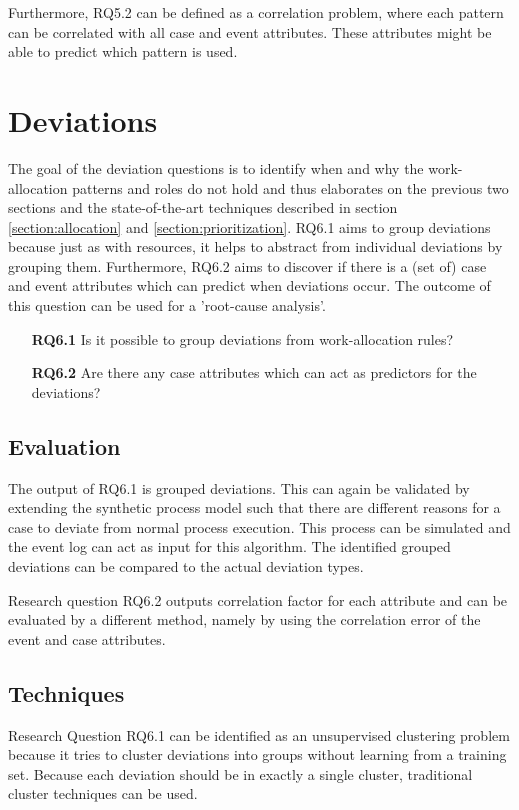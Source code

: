 Furthermore, RQ5.2 can be defined as a correlation problem, where each pattern can be correlated with all case and event attributes. These attributes might be able to predict which pattern is used. 


\section{Deviations}
The goal of the deviation questions is to identify when and why the work-allocation patterns and roles do not hold and thus elaborates on the previous two sections and the state-of-the-art techniques described in section \ref{section:allocation} and \ref{section:prioritization}. RQ6.1 aims to group deviations because just as with resources, it helps to abstract from individual deviations by grouping them. Furthermore, RQ6.2 aims to discover if there is a (set of) case and event attributes which can predict when deviations occur. The outcome of this question can be used for a 'root-cause analysis'.

\begin{enumerate}
\item[\textbf{RQ6.1}] Is it possible to group deviations from work-allocation rules? 
\item[\textbf{RQ6.2}] Are there any case attributes which can act as predictors for the deviations? 
\end{enumerate}

\subsection{Evaluation}
The output of RQ6.1 is grouped deviations. This can again be validated by extending the synthetic process model such that there are different reasons for a case to deviate from normal process execution. This process can be simulated and the event log can act as input for this algorithm. The identified grouped deviations can be compared to the actual deviation types. 

Research question RQ6.2 outputs correlation factor for each attribute and can be evaluated by a different method, namely by using the correlation error of the event and case attributes.

\subsection{Techniques}
Research Question RQ6.1 can be identified as an unsupervised clustering problem because it tries to cluster deviations into groups without learning from a training set. Because each deviation should be in exactly a single cluster, traditional cluster techniques can be used.  

